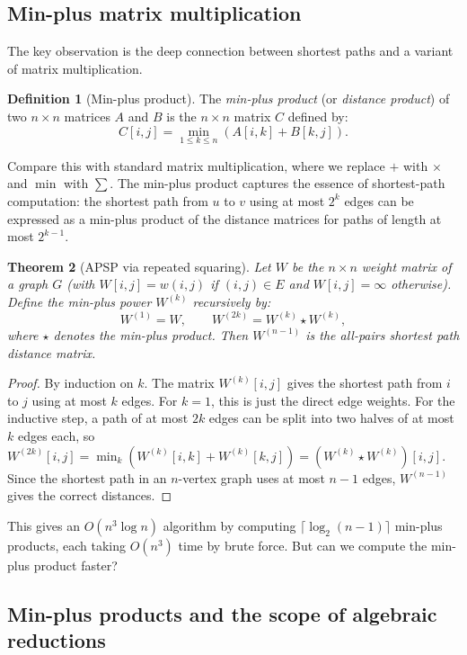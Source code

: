 \documentclass[twoside,12pt]{book}
\theoremstyle{plain}
\newtheorem{theorem}{Theorem}[chapter]
\theoremstyle{definition}
\newtheorem{definition}[theorem]{Definition}
\theoremstyle{remark}
\begin{document}
\subsection{Min-plus matrix multiplication}

The key observation is the deep connection between shortest paths and a variant of matrix multiplication.

\begin{definition}[Min-plus product]
The \emph{min-plus product} (or \emph{distance product}) of two $n \times n$ matrices $A$ and $B$ is the $n \times n$ matrix $C$ defined by:
\[
C[i, j] = \min_{1 \leq k \leq n} \left( A[i, k] + B[k, j] \right).
\]
\end{definition}

Compare this with standard matrix multiplication, where we replace $+$ with $\times$ and $\min$ with $\sum$. The min-plus product captures the essence of shortest-path computation: the shortest path from $u$ to $v$ using at most $2^k$ edges can be expressed as a min-plus product of the distance matrices for paths of length at most $2^{k-1}$.

\begin{theorem}[APSP via repeated squaring]
\label{thm:apsp-squaring}
Let $W$ be the $n \times n$ weight matrix of a graph $G$ (with $W[i,j] = w(i,j)$ if $(i,j) \in E$ and $W[i,j] = \infty$ otherwise). Define the min-plus power $W^{(k)}$ recursively by:
\[
W^{(1)} = W, \qquad W^{(2k)} = W^{(k)} \star W^{(k)},
\]
where $\star$ denotes the min-plus product. Then $W^{(n-1)}$ is the all-pairs shortest path distance matrix.
\end{theorem}

\begin{proof}
By induction on $k$. The matrix $W^{(k)}[i,j]$ gives the shortest path from $i$ to $j$ using at most $k$ edges. For $k = 1$, this is just the direct edge weights. For the inductive step, a path of at most $2k$ edges can be split into two halves of at most $k$ edges each, so $W^{(2k)}[i,j] = \min_k (W^{(k)}[i,k] + W^{(k)}[k,j]) = (W^{(k)} \star W^{(k)})[i,j]$. Since the shortest path in an $n$-vertex graph uses at most $n - 1$ edges, $W^{(n-1)}$ gives the correct distances.
\end{proof}

This gives an $O(n^3 \log n)$ algorithm by computing $\lceil \log_2(n-1) \rceil$ min-plus products, each taking $O(n^3)$ time by brute force. But can we compute the min-plus product faster?

\subsection{Min-plus products and the scope of algebraic reductions}
\end{document}
